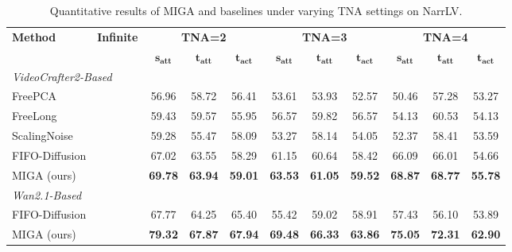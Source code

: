 \documentclass{llmxive}
\begin{document}
\begin{table}[t]
\centering
\small
\begin{tabular}{l c ccc ccc ccc}
    \toprule
    \multirow{2}{*}{\textbf{Method}} & \multirow{2}{*}{\textbf{Infinite}} 
    & \multicolumn{3}{c}{\textbf{TNA=2}} 
    & \multicolumn{3}{c}{\textbf{TNA=3}} 
    & \multicolumn{3}{c}{\textbf{TNA=4}} \\
    \cmidrule(lr){3-5} \cmidrule(lr){6-8} \cmidrule(lr){9-11}
    & 
    & $\boldsymbol{s_{\text{att}}}$ & $\boldsymbol{t_{\text{att}}}$ & $\boldsymbol{t_{\text{act}}}$ 
    & $\boldsymbol{s_{\text{att}}}$ & $\boldsymbol{t_{\text{att}}}$ & $\boldsymbol{t_{\text{act}}}$ 
    & $\boldsymbol{s_{\text{att}}}$ & $\boldsymbol{t_{\text{att}}}$ & $\boldsymbol{t_{\text{act}}}$ \\
    \midrule
    \multicolumn{11}{l}{\textit{VideoCrafter2-Based}} \\
    \midrule
    FreePCA  &  
        & 56.96 & 58.72 & 56.41
        & 53.61 & 53.93 & 52.57
        & 50.46 & 57.28 & 53.27 \\
    FreeLong & 
        & 59.43 & 59.57 & 55.95
        & 56.57 & 59.82 & 56.57
        & 54.13 & 60.53 & 54.13 \\
    ScalingNoise  & 
        & 59.28 & 55.47 & 58.09
        & 53.27 & 58.14 & 54.05 
        & 52.37 & 58.41 & 53.59 \\
    FIFO-Diffusion    & 
        & 67.02 & 63.55 & 58.29
        & 61.15 & 60.64 & 58.42
        & 66.09 & 66.01 & 54.66 \\
    MIGA (ours)        & 
        & \textbf{69.78} & \textbf{63.94} & \textbf{59.01}
        & \textbf{63.53} & \textbf{61.05} & \textbf{59.52}
        & \textbf{68.87} & \textbf{68.77} & \textbf{55.78} \\
    \midrule
    \multicolumn{11}{l}{\textit{Wan2.1-Based}} \\
    \midrule
    FIFO-Diffusion
        & 
        & 67.77 & 64.25 & 65.40
        & 55.42 & 59.02 & 58.91
        & 57.43 & 56.10 & 53.89 \\
    MIGA (ours)
        & 
        & \textbf{79.32} & \textbf{67.87} & \textbf{67.94}
        & \textbf{69.48} & \textbf{66.33} & \textbf{63.86}
        & \textbf{75.05} & \textbf{72.31} & \textbf{62.90} \\
    \bottomrule
\end{tabular}
\caption{Quantitative results of MIGA and baselines under varying TNA settings on NarrLV.}
\label{tab:narrlv-results}
\end{table}
\end{document}
